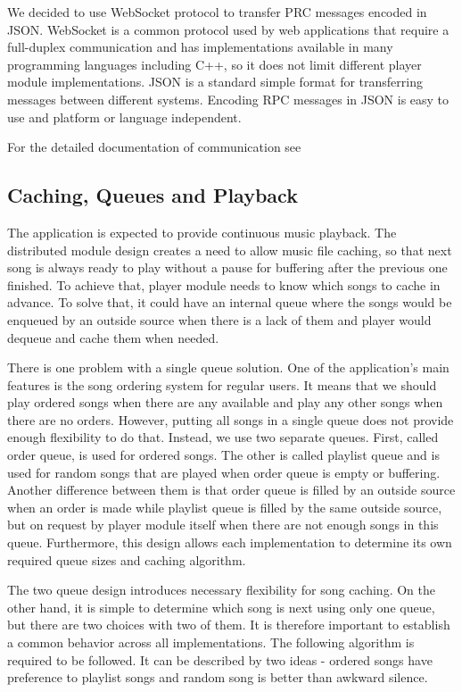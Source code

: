 \par
We decided to use WebSocket protocol to transfer PRC messages encoded in JSON. WebSocket is a common protocol used by web applications that require a full-duplex communication and has implementations available in many programming languages including C++, so it does not limit different player module implementations. JSON is a standard simple format for transferring messages between different systems. Encoding RPC messages in JSON is easy to use and platform or language independent.
\par
For the detailed documentation of communication see 

\subsection{Caching, Queues and Playback}

The application is expected to provide continuous music playback. The distributed module design creates a need to allow music file caching, so that next song is always ready to play without a pause for buffering after the previous one finished. To achieve that, player module needs to know which songs to cache in advance. To solve that, it could have an internal queue where the songs would be enqueued by an outside source when there is a lack of them and player would dequeue and cache them when needed.
\par
There is one problem with a single queue solution. One of the application's main features is the song ordering system for regular users. It means that we should play ordered songs when there are any available and play any other songs when there are no orders. However, putting all songs in a single queue does not provide enough flexibility to do that. Instead, we use two separate queues. First, called order queue, is used for ordered songs. The other is called playlist queue and is used for random songs that are played when order queue is empty or buffering. Another difference between them is that order queue is filled by an outside source when an order is made while playlist queue is filled by the same outside source, but on request by player module itself when there are not enough songs in this queue. Furthermore, this design allows each implementation to determine its own required queue sizes and caching algorithm.
\par
The two queue design introduces necessary flexibility for song caching. On the other hand, it is simple to determine which song is next using only one queue, but there are two choices with two of them. It is therefore important to establish a common behavior across all implementations. The following algorithm is required to be followed. It can be described by two ideas - ordered songs have preference to playlist songs and random song is better than awkward silence.


